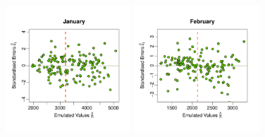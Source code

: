 \documentclass[a4paper, 12pt]{article}
\begin{document}
\renewcommand{\scale}{12.7em}
\begin{figure}
\centering
 \includegraphics[width=\scale]{Validation_Plots/Validation_Scatter_01_Jan}\hspace{-1ex}
 \includegraphics[width=\scale]{Validation_Plots/Validation_Scatter_02_Feb}\hspace{-1ex}

\end{figure}
\end{document}
